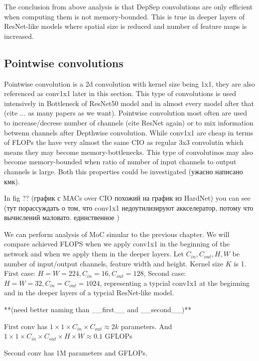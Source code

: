 The conclusion from above analysis is that DepSep convolutions are only efficient when computing them is not memory-bounded. This is true in deeper layers of ResNet-like models where spatial size is reduced and number of feature maps is increased. 

\subsection{Pointwise convolutions}

Pointwise convolution is a 2d convolution with kernel size being 1x1, they are also referenced as conv1x1 later in this section. This type of convolutions is used intensively in Bottleneck of ResNet50 model and in almost every model after that (cite ... as many papers as we want). Pointwise convolution most often are used to increase/decrese number of channels (cite ResNet again) or to mix information betwenn channels after Depthwise convolution. While conv1x1 are cheap in terms of FLOPs the have very almost the same CIO as regular 3x3 convolutin which means they may become memory-bottlenecks. This type of convolutinos may also become memory-bounded when ratio of number of input channels to output channels is large. Both this properties could be investigated (ужасно написано кмк).

In fig ?? (график с MACs over CIO похожий на график из HardNet) you can see 
(тут порассуждать о том, что conv1x1 недоутилизируют аккселератор, потому что вычислений маловато. единственное )

We can perform analysis of MoC simular to the previous chapter. We will compare achieved FLOPS when we apply conv1x1 in the beginning of the network and when we apply them in the deeper layers. Let $C_{in}, C_{out}, H, W$ be number of input/output channels, feature width and height. Kernel size $K$ is 1. First case: $H=W=224, C_{in} = 16, C_{out}=128$, Second case: $H=W=32, C_{in} = C_{out}=1024$, representing a typcial conv1x1 at the beginning and in the deeper layers of a typcial ResNet-like model.

**(need better naming than __first__ and __second__)**

First conv has $ 1 \times 1 \times C_{in} \times C_{out} \approx 2k$ parameters. And $ 1 \times 1 \times C_{in} \times C_{out} \times H \times W \approx 0.1 $ GFLOPs

Second conv has \approx 1M parameters and  GFLOPs. 

%

